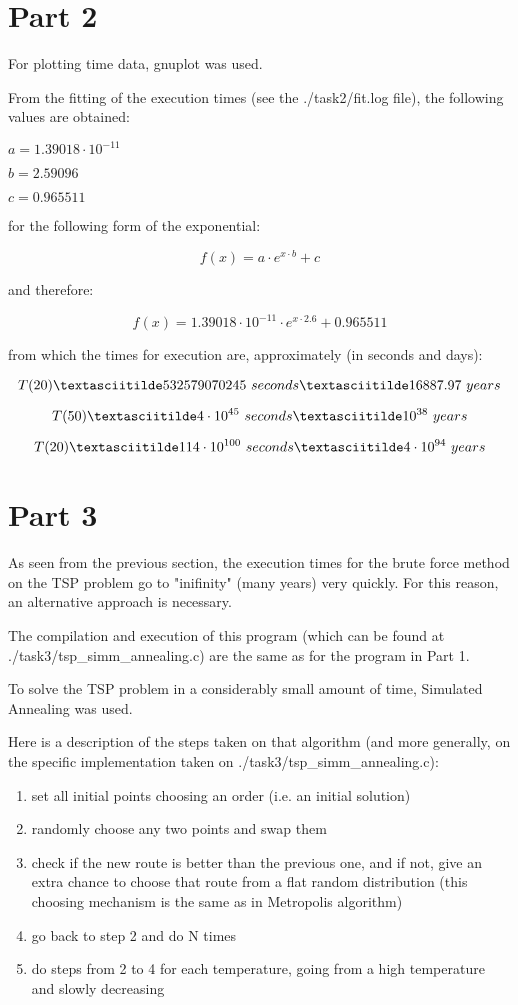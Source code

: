 \documentclass[paper=a4, fontsize=11pt]{scrartcl} %
\numberwithin{equation}{section} %
\numberwithin{figure}{section} %
\numberwithin{table}{section} %
\begin{document}
\section{Part 2}

For plotting time data, gnuplot was used.

From the fitting of the execution times (see the ./task2/fit.log file), the following values are obtained:

$a = 1.39018 \cdot 10^{-11}$

$b = 2.59096$

$c = 0.965511$

for the following form of the exponential:

$$ f(x) = a\cdot e^{x\cdot b} + c $$

and therefore:

$$ f(x) = 1.39018 \cdot 10^{-11} \cdot e^{x\cdot 2.6} + 0.965511 $$

from which the times for execution are, approximately (in seconds and days):

$$ T(20) \textasciitilde 532579070245 \ seconds \textasciitilde 16887.97 \ years $$

$$ T(50) \textasciitilde 4 \cdot 10^{45} \ seconds \textasciitilde 10^{38} \ years $$

$$ T(20) \textasciitilde 114 \cdot 10^{100} \ seconds \textasciitilde 4 \cdot 10^{94} \ years $$

\section{Part 3}

As seen from the previous section, the execution times for the brute force method on the TSP problem go to "inifinity" (many years) very quickly. For this reason, an alternative approach is necessary.

The compilation and execution of this program (which can be found at ./task3/tsp\_simm\_annealing.c) are the same as for the program in Part 1.

To solve the TSP problem in a considerably small amount of time, Simulated Annealing was used.

Here is a description of the steps taken on that algorithm (and more generally, on the specific implementation taken on ./task3/tsp\_simm\_annealing.c):

\begin{enumerate}
\item set all initial points choosing an order (i.e. an initial solution)
\item randomly choose any two points and swap them
\item check if the new route is better than the previous one, and if not, give an extra chance to choose that route from a flat random distribution (this choosing mechanism is the same as in Metropolis algorithm)
\item go back to step 2 and do N times
\item do steps from 2 to 4 for each temperature, going from a high temperature and slowly decreasing
\end{enumerate}
\end{document}
